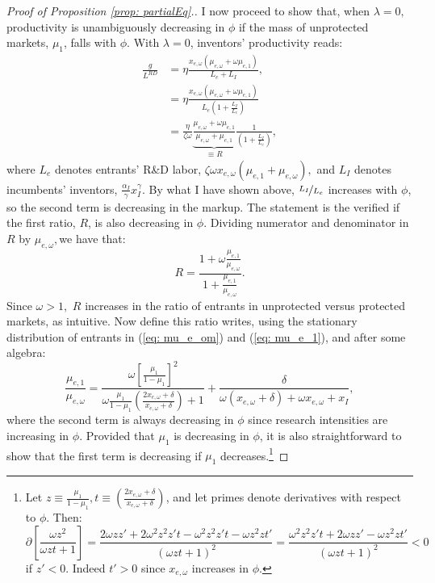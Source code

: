 \begin{proof}[Proof of Proposition \ref{prop: partialEq}.]
I now proceed to show that, when $\lambda=0,$ productivity is unambiguously
decreasing in $\phi$ if the mass of unprotected markets, $\mu_{1}$,
falls with $\phi$. With $\lambda=0$, inventors' productivity reads:
\begin{align*}
\frac{g}{L^{RD}} & =\eta\frac{x_{e,\omega}\left(\mu_{e,\omega}+\omega\mu_{e,1}\right)}{L_{e}+L_{I}},\\
 & =\eta\frac{x_{e,\omega}\left(\mu_{e,\omega}+\omega\mu_{e,1}\right)}{L_{e}\left(1+\frac{L_{I}}{L_{e}}\right)}\\
 & =\frac{\eta}{\zeta\omega}\underset{\equiv R}{\underbrace{\frac{\mu_{e,\omega}+\omega\mu_{e,1}}{\mu_{e,\omega}+\mu_{e,1}}}}\frac{1}{\left(1+\frac{L_{I}}{L_{e}}\right)},
\end{align*}
where $L_{e}$ denotes entrants' R\&D labor, $\zeta\omega x_{e,\omega}\left(\mu_{e,1}+\mu_{e,\omega}\right),$
and $L_{I}$ denotes incumbents' inventors, $\frac{\alpha_{I}}{\gamma}x_{I}^{\gamma}.$
By what I have shown above, $\nicefrac{L_{I}}{L_{e}}$ increases with
$\phi$, so the second term is decreasing in the markup. The statement
is the verified if the first ratio, $R$, is also decreasing in $\phi.$
Dividing numerator and denominator in $R$ by $\mu_{e,\omega},$we
have that: 
\[
R=\frac{1+\omega\frac{\mu_{e,1}}{\mu_{e,\omega}}}{1+\frac{\mu_{e,1}}{\mu_{e,\omega}}}.
\]
Since $\omega>1,$ $R$ increases in the ratio of entrants in unprotected
versus protected markets, as intuitive. Now define this ratio writes,
using the stationary distribution of entrants in (\ref{eq: mu_e_om})
and (\ref{eq: mu_e_1}), and after some algebra:
\[
\frac{\mu_{e,1}}{\mu_{e,\omega}}=\frac{\omega\left[\frac{\mu_{1}}{1-\mu_{1}}\right]^{2}}{\omega\frac{\mu_{1}}{1-\mu_{1}}\left(\frac{2x_{e,\omega}+\delta}{x_{e,\omega}+\delta}\right)+1}+\frac{\delta}{\omega\left(x_{e,\omega}+\delta\right)+\omega x_{e,\omega}+x_{I}},
\]
where the second term is always decreasing in $\phi$ since research
intensities are increasing in $\phi$.  Provided that $\mu_{1}$
is decreasing in $\phi$, it is also straightforward to show that
the first term is decreasing if $\mu_{1}$ decreases.\footnote{Let $z\equiv\frac{\mu_{1}}{1-\mu_{1}},t\equiv\left(\frac{2x_{e,\omega}+\delta}{x_{e,\omega}+\delta}\right)$,
and let primes denote derivatives with respect to $\phi$. Then:
\[
\partial\left[\frac{\omega z^{2}}{\omega zt+1}\right]=\frac{2\omega zz'+2\omega^{2}z^{2}z't-\omega^{2}z^{2}z't-\omega z^{2}zt'}{\left(\omega zt+1\right)^{2}}=\frac{\omega^{2}z^{2}z't+2\omega zz'-\omega z^{2}zt'}{\left(\omega zt+1\right)^{2}}<0
\]
if $z'<0.$ Indeed $t'>0$ since $x_{e,\omega}$ increases in $\phi.$}


\end{proof}
